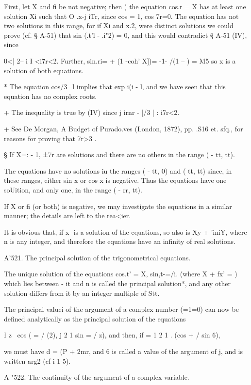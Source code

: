 First, let X and fi be not negative; then ) the equation cos.r
= X has at least one solution Xi such that O .x-j iTr, since cos = 1,
cos 7r=0. The equation has not two solutions in this range, for if Xi
and x.2, were distinct solutions we could prove (cf. § A-51) that sin
(.t'l - .i"2) = 0, and this would contradict § A-51 (IV), since

0<| 2-- i I <i7r<2. Further, sin.ri= + (1 -coh' X])= -1- /(1 -- ) = M5
so x is a solution of both equations.

* The equation cos/3=l implies that exp i(i - l, and we have seen that
this equation has no complex roots.

+ The inequality is true by (IV) since j irnr - |/3 | : i7r<2.

+ See De Morgan, A Budget of Purado.ves (London, 1872), pp. .S16 et.
sfq., for reasons for proving that 7r>3 .

§ If X=: - 1, ±7r are solutions and there are no others in the range (
- tt, tt).

%
%

The equations have no solutions iu the ranges ( - tt, 0) and ( tt, tt)
since, in these ranges, either sin x or cos x is negative. Thus the
equations have one soUition, and only one, in the range ( - rr, tt).

If X or fi (or both) is negative, we may investigate the equations in
a similar manner; the details are left to the rea<ier.

It is obvious that, if x- is a solution of the equations, so also is
Xy + 'iniY, where n is any integer, and therefore the equations have
an infinity of real solutions.

A'521. The principal solution of the trigonometrical equations.

The unique solution of the equations cos.t' = X, sin,t-=/i. (where X +
fx' = ) which lies between - it and n is called the principal
solution*, and any other solution differs from it by an integer
multiple of Stt.

The principal valuei of the argument of a complex number (=1=0) can
now be defined analytically as the principal solution of the equations

I z \ cos ( = / (2), j 2 1 sin = / z), and then, if = 1 2 1 . (cos + /
sin 6),

we must have d = (P + 2mr, and 6 is called a value of the argument of
j, and is written arg2 (cf i 1-5).

A "522. The continuity of the argument of a complex variable.

